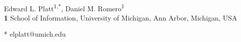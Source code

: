 \documentclass[10pt,letterpaper]{article}
\begin{document}
\vspace*{0.2in}

\begin{flushleft}
{\Large
\textbf{} %
}
\newline
\\
Edward L. Platt\textsuperscript{1,*},
Daniel M. Romero\textsuperscript{1}
\\
\bigskip
\textbf{1} School of Information, University of Michigan, Ann Arbor, Michigan, USA
\\
\bigskip

% 
%





* elplatt@umich.edu

\end{flushleft}
\end{document}
